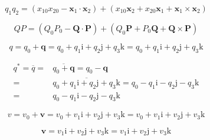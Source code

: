 \documentclass[
]{book}
\theoremstyle{definition}
\theoremstyle{definition}
\theoremstyle{definition}
\theoremstyle{definition}
\theoremstyle{remark}
\begin{document}
\[
q_{{\scriptscriptstyle 1}}q_{{\scriptscriptstyle 2}}=\left(x_{{\scriptscriptstyle 10}}x_{{\scriptscriptstyle 20}}-\boldsymbol{x}_{{\scriptscriptstyle 1}}\cdot\boldsymbol{x}_{{\scriptscriptstyle 2}}\right)+\left(x_{{\scriptscriptstyle 10}}\boldsymbol{x}_{{\scriptscriptstyle 2}}+x_{{\scriptscriptstyle 20}}\boldsymbol{x}_{{\scriptscriptstyle 1}}+\boldsymbol{x}_{{\scriptscriptstyle 1}}\times\boldsymbol{x}_{{\scriptscriptstyle 2}}\right)
\]

\[
QP=\left(Q_{{\scriptscriptstyle 0}}P_{{\scriptscriptstyle 0}}-\boldsymbol{Q}\cdot\boldsymbol{P}\right)+\left(Q_{{\scriptscriptstyle 0}}\boldsymbol{P}+P_{{\scriptscriptstyle 0}}\boldsymbol{Q}+\boldsymbol{Q}\times\boldsymbol{P}\right)
\]

\[
q=q_{{\scriptscriptstyle 0}}+\boldsymbol{q}=q_{{\scriptscriptstyle 0}}+q_{{\scriptscriptstyle 1}}\mathrm{i}+q_{{\scriptscriptstyle 2}}\mathrm{j}+q_{{\scriptscriptstyle 3}}\mathrm{k}=q_{{\scriptscriptstyle 0}}+q_{{\scriptscriptstyle 1}}\boldsymbol{\mathrm{i}}+q_{{\scriptscriptstyle 2}}\boldsymbol{\mathrm{j}}+q_{{\scriptscriptstyle 3}}\boldsymbol{\mathrm{k}}
\]

\[
\begin{aligned}
q^{*}=\overline{q}= & \overline{q_{{\scriptscriptstyle 0}}+\boldsymbol{q}}=q_{{\scriptscriptstyle 0}}-\boldsymbol{q}\\
= & \overline{q_{{\scriptscriptstyle 0}}+q_{{\scriptscriptstyle 1}}\mathrm{i}+q_{{\scriptscriptstyle 2}}\mathrm{j}+q_{{\scriptscriptstyle 3}}\mathrm{k}}=q_{{\scriptscriptstyle 0}}-q_{{\scriptscriptstyle 1}}\mathrm{i}-q_{{\scriptscriptstyle 2}}\mathrm{j}-q_{{\scriptscriptstyle 3}}\mathrm{k}\\
= & q_{{\scriptscriptstyle 0}}-q_{{\scriptscriptstyle 1}}\boldsymbol{\mathrm{i}}-q_{{\scriptscriptstyle 2}}\boldsymbol{\mathrm{j}}-q_{{\scriptscriptstyle 3}}\boldsymbol{\mathrm{k}}
\end{aligned}
\]

\[
v=v_{{\scriptscriptstyle 0}}+\boldsymbol{v}=v_{{\scriptscriptstyle 0}}+v_{{\scriptscriptstyle 1}}\mathrm{i}+v_{{\scriptscriptstyle 2}}\mathrm{j}+v_{{\scriptscriptstyle 3}}\mathrm{k}=v_{{\scriptscriptstyle 0}}+v_{{\scriptscriptstyle 1}}\boldsymbol{\mathrm{i}}+v_{{\scriptscriptstyle 2}}\boldsymbol{\mathrm{j}}+v_{{\scriptscriptstyle 3}}\boldsymbol{\mathrm{k}}
\]

\[
\boldsymbol{v}=v_{{\scriptscriptstyle 1}}\mathrm{i}+v_{{\scriptscriptstyle 2}}\mathrm{j}+v_{{\scriptscriptstyle 3}}\mathrm{k}=v_{{\scriptscriptstyle 1}}\boldsymbol{\mathrm{i}}+v_{{\scriptscriptstyle 2}}\boldsymbol{\mathrm{j}}+v_{{\scriptscriptstyle 3}}\boldsymbol{\mathrm{k}}
\]
\end{document}

